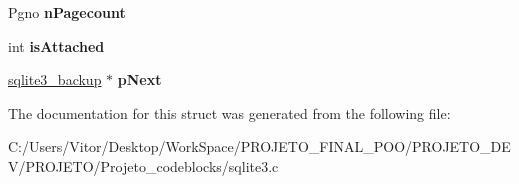\begin{DoxyCompactItemize}
\item 
\hypertarget{structsqlite3__backup_a98599d5a3a13173a6a126242d1fbbaa8}{Pgno {\bfseries n\-Pagecount}}\label{structsqlite3__backup_a98599d5a3a13173a6a126242d1fbbaa8}

\item 
\hypertarget{structsqlite3__backup_af515f0d9265847d820cbaad41cef78ae}{int {\bfseries is\-Attached}}\label{structsqlite3__backup_af515f0d9265847d820cbaad41cef78ae}

\item 
\hypertarget{structsqlite3__backup_a3a87332e045fe4a477fe262409c6011a}{\hyperlink{structsqlite3__backup}{sqlite3\-\_\-backup} $\ast$ {\bfseries p\-Next}}\label{structsqlite3__backup_a3a87332e045fe4a477fe262409c6011a}

\end{DoxyCompactItemize}


The documentation for this struct was generated from the following file\-:\begin{DoxyCompactItemize}
\item 
C\-:/\-Users/\-Vitor/\-Desktop/\-Work\-Space/\-P\-R\-O\-J\-E\-T\-O\-\_\-\-F\-I\-N\-A\-L\-\_\-\-P\-O\-O/\-P\-R\-O\-J\-E\-T\-O\-\_\-\-D\-E\-V/\-P\-R\-O\-J\-E\-T\-O/\-Projeto\-\_\-codeblocks/sqlite3.\-c\end{DoxyCompactItemize}
